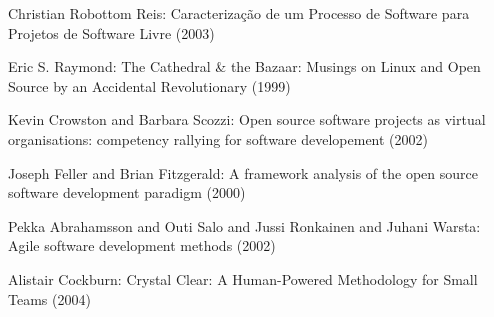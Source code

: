 \documentclass[lnbip]{svmultln}
\begin{document}
\begin{thebibliography}{5}
 Christian Robottom Reis: Caracteriza\c{c}\~{a}o de
  um Processo de Software para Projetos de Software Livre (2003)

 Eric S. Raymond: The Cathedral \& the Bazaar:
  Musings on {Linux} and Open Source by an Accidental Revolutionary
  (1999)

 Kevin Crowston and Barbara Scozzi: Open source
  software projects as virtual organisations: competency rallying for
  software developement (2002)

 Joseph Feller and Brian Fitzgerald: A
  framework analysis of the open source software development paradigm
  (2000)

 Pekka Abrahamsson and Outi Salo and Jussi
  Ronkainen and Juhani Warsta: Agile software development methods
  (2002)

 Alistair Cockburn: Crystal Clear: A
  Human-Powered Methodology for Small Teams (2004)











\end{thebibliography}
\end{document}
